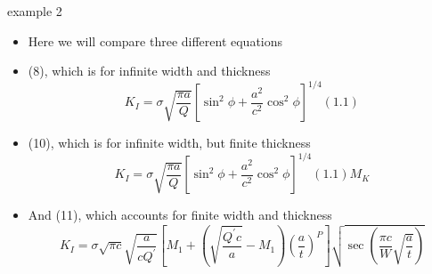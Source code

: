\documentclass[10pt]{beamer}
\begin{document}
\begin{frame}{example 2}
	\begin{itemize}
		\item Here we will compare three different equations
		\item (8), which is for infinite width and thickness
		\begin{equation*}
		K_I = \sigma \sqrt{\frac{\pi a}{Q}} \left[\sin^2 \phi + \frac{a^2}{c^2} \cos^2 \phi\right]^{1/4}(1.1) \tag{8}
		\end{equation*}
		\item (10), which is for infinite width, but finite thickness
		\begin{equation*}
		K_I = \sigma \sqrt{\frac{\pi a}{Q}} \left[\sin^2 \phi + \frac{a^2}{c^2} \cos^2 \phi\right]^{1/4}(1.1) M_K \tag{10}
		\end{equation*}
		\item And (11), which accounts for finite width and thickness
		\begin{equation*}
		K_I = \sigma \sqrt{\pi c} \sqrt{\frac{a}{c Q^\prime}} \left[M_1 + \left(\sqrt{\frac{Q^\prime c}{a}}-M_1\right)\left(\frac{a}{t}\right)^P\right]\sqrt{\sec \left(\frac{\pi c}{W} \sqrt{\frac{a}{t}}\right)} \tag{11}
		\end{equation*}
	\end{itemize}
\end{frame}
\end{document}

